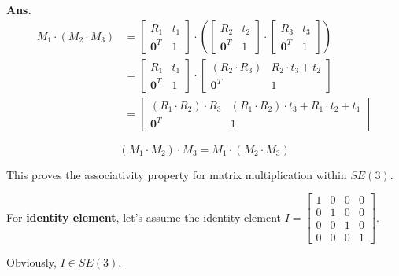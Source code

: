 \documentclass[12pt, a4paper, UTF8, fontset=windows]{ctexbook}
\newenvironment{solution}{\par\noindent\textbf{Ans.}}{\par}
\begin{document}
\begin{solution}
    $$
     \begin{aligned}
     M_1 \cdot (M_2 \cdot M_3) &= \begin{bmatrix} R_1 & t_1 \\ \mathbf{0}^T & 1 \end{bmatrix} \cdot \left(\begin{bmatrix} R_2 & t_2 \\ \mathbf{0}^T & 1 \end{bmatrix} \cdot \begin{bmatrix} R_3 & t_3 \\ \mathbf{0}^T & 1 \end{bmatrix}\right) \\
     &= \begin{bmatrix} R_1 & t_1 \\ \mathbf{0}^T & 1 \end{bmatrix} \cdot \begin{bmatrix} (R_2 \cdot R_3) & R_2 \cdot t_3 + t_2 \\ \mathbf{0}^T & 1 \end{bmatrix} \\
     &= \begin{bmatrix} (R_1 \cdot R_2) \cdot R_3 & (R_1 \cdot R_2) \cdot t_3 + R_1 \cdot t_2 + t_1 \\ \mathbf{0}^T & 1 \end{bmatrix}
    \end{aligned}
    $$

    $$
    (M_1 \cdot M_2) \cdot M_3 
    =
    M_1 \cdot (M_2 \cdot M_3)
    $$
    
    This proves the associativity property for matrix multiplication within $SE(3)$.

    For \textbf{identity element}, let's assume the identity element 
    $
    I = \begin{bmatrix}
    1 & 0 & 0 & 0 \\
    0 & 1 & 0 & 0 \\
    0 & 0 & 1 & 0 \\
    0 & 0 & 0 & 1
    \end{bmatrix}
    $. 
    
    Obviously, $I \in SE(3)$.


\end{solution}
\end{document}
